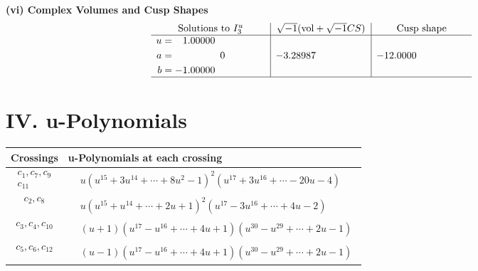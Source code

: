 \documentclass[1p]{elsarticle_modified}
\theoremstyle{definition}
\newcommand{\I}{\sqrt{-1}}
\begin{document}
\newpage\flushleft \textbf{(vi) Complex Volumes and Cusp Shapes}
$$\begin{array}{c|c|c}  
\text{Solutions to }I^u_{3}& \I (\text{vol} + \sqrt{-1}CS) & \text{Cusp shape}\\
 \hline 
\begin{aligned}
u &= \phantom{-}1.00000\phantom{ +0.000000I} \\
a &= \phantom{-0.000000 } 0 \\
b &= -1.00000\phantom{ +0.000000I}\end{aligned}
 & -3.28987\phantom{ +0.000000I} & -12.0000\phantom{ +0.000000I}\\
 \hline 
 \end{array}$$\newpage
\newpage\renewcommand{\arraystretch}{1}
\centering \section*{ IV. u-Polynomials}
\begin{tabular}{m{50pt}|m{274pt}}
Crossings & \hspace{64pt}u-Polynomials at each crossing \\
\hline $$\begin{aligned}c_{1},c_{7},c_{9}\\c_{11}\end{aligned}$$&$\begin{aligned}
&u(u^{15}+3 u^{14}+\cdots+8 u^2-1)^{2}(u^{17}+3 u^{16}+\cdots-20 u-4)
\end{aligned}$\\
\hline $$\begin{aligned}c_{2},c_{8}\end{aligned}$$&$\begin{aligned}
&u(u^{15}+u^{14}+\cdots+2 u+1)^{2}(u^{17}-3 u^{16}+\cdots+4 u-2)
\end{aligned}$\\
\hline $$\begin{aligned}c_{3},c_{4},c_{10}\end{aligned}$$&$\begin{aligned}
&(u+1)(u^{17}- u^{16}+\cdots+4 u+1)(u^{30}- u^{29}+\cdots+2 u-1)
\end{aligned}$\\
\hline $$\begin{aligned}c_{5},c_{6},c_{12}\end{aligned}$$&$\begin{aligned}
&(u-1)(u^{17}- u^{16}+\cdots+4 u+1)(u^{30}- u^{29}+\cdots+2 u-1)
\end{aligned}$\\
\hline
\end{tabular}\newpage\renewcommand{\arraystretch}{1}
\end{document}
